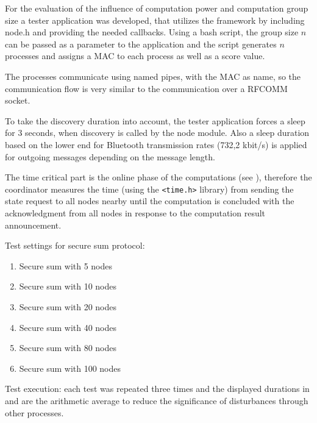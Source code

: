 For the evaluation of the influence of computation power and computation group size a tester application was developed, that utilizes the framework by including node.h and providing the needed callbacks. Using a bash script, the group size $n$ can be passed as a parameter to the application and the script generates $n$ processes and assigns a \gls{MAC} to each process as well as a score value.

The processes communicate using named pipes, with the \gls{MAC} as name, so the communication flow is very similar to the communication over a \gls{RFCOMM} socket.

To take the discovery duration into account, the tester application forces a sleep for 3 seconds, when discovery is called by the node module. Also a sleep duration based on the lower end for Bluetooth transmission rates (732,2 kbit/s) is applied for outgoing messages depending on the message length.

The time critical part is the online phase of the computations (see ), therefore the coordinator measures the time (using the \lstinline|<time.h>| library) from sending the state request to all nodes nearby until the computation is concluded with the acknowledgment from all nodes in response to the computation result announcement.

Test settings for secure sum protocol:
\begin{enumerate}
	\item Secure sum with 5 nodes
	\item Secure sum with 10 nodes
	\item Secure sum with 20 nodes
	\item Secure sum with 40 nodes
	\item Secure sum with 80 nodes
	\item Secure sum with 100 nodes
\end{enumerate}

Test execution: each test was repeated three times and the displayed durations in  and  are the arithmetic average to reduce the significance of disturbances through other processes.

